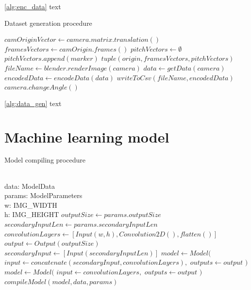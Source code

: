 \documentclass[
    11pt,
    twoside
]{report}
\begin{document}
\ref{alg:enc_data} text


\begin{algorithm}[H]
\begin{algorithmic}
\caption{Dataset generation procedure}\label{alg:data_gen}
    \State $camOriginVector \gets camera.matrix.translation()$
    \State $framesVectors \gets camOrigin.frames()$
    \State $pitchVectors \gets \emptyset$
        \State $pitchVectors.append(marker)$
    \EndFor
    \State
    \Return $tuple(origin, framesVectors, pitchVectors)$
\EndProcedure
{}
    \State $fileName \gets blender.renderImage(camera)$
    \State $data \gets getData(camera)$
    \State $encodedData \gets encodeData(data)$
    \State $writeToCsv(fileName, encodedData)$
    \State $camera.changeAngle()$
\EndFor
\end{algorithmic}
\end{algorithm}


\ref{alg:data_gen} text




\section{Machine learning model}



\begin{algorithm}[H]
\begin{algorithmic}
\caption{Model compiling procedure}\label{alg:model_comp}
\Require \\
    data: ModelData \\
    params: ModelParameters \\
    w: IMG\_WIDTH \\
    h: IMG\_HEIGHT
\State
\State $outputSize \gets params.outputSize$
\State $secondaryInputLen \gets params.secondaryInputLen$
\State $convolutionLayers \gets [Input(w, h), Convolution2D(), flatten()]$
\State $output \gets Output(outputSize)$
    \State $secondaryInput \gets [Input(secondaryInputLen)]$
    \State $model \gets Model($
        \State \indent $input \gets concatenate(secondaryInput, convolutionLayers),$
            \State \indent $outputs \gets output$
    \State $)$
\Else
    \State $model \gets Model($
        \State \indent $input \gets convolutionLayers,$
        \State \indent $outputs \gets output$
    \State $)$
\EndIf
\State $compileModel(model, data, params)$
\end{algorithmic}
\end{algorithm}
\end{document}
